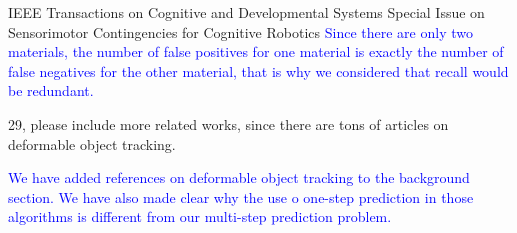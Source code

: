 \documentclass[a4paper,12pt]{letter}
\newcommand{\comment}[1]{\textcolor{blue}{#1}}
\begin{document}
\begin{letter}{IEEE Transactions on Cognitive and Developmental Systems\newline
Special Issue on Sensorimotor Contingencies for Cognitive Robotics}
\comment{Since there are only two materials, the number of false positives for one material is exactly the number of false negatives for the other material, that is why we considered that recall would be redundant.}

29, please include more related works, since there are tons of articles on deformable object tracking.

\comment{We have added references on deformable object tracking to the background section. We have also made clear why the use o one-step prediction in those algorithms is different from our multi-step prediction problem. }



\end{letter}
\end{document}
